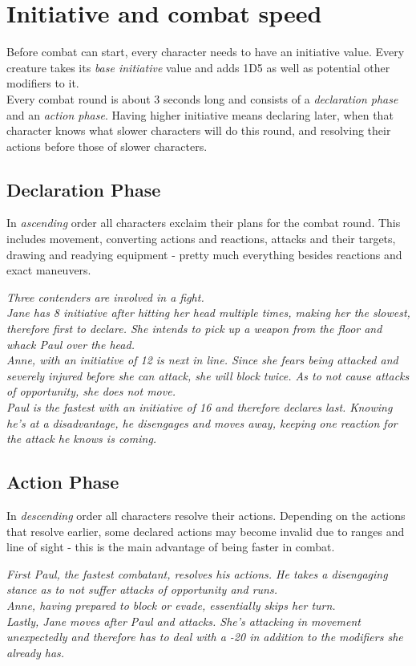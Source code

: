 \section{Initiative and combat speed}
Before combat can start, every character needs to have an initiative value. Every creature takes its \emph{base initiative} value and adds 1D5 as well as potential other modifiers to it.\\
Every combat round is about 3 seconds long and consists of a \textit{declaration phase} and an \textit{action phase}. Having higher initiative means declaring later, when that character knows what slower characters will do this round, and resolving their actions before those of slower characters.
\subsection{Declaration Phase}
In \emph{ascending} order all characters exclaim their plans for the combat round. This includes movement, converting actions and reactions, attacks and their targets, drawing and readying equipment - pretty much everything besides reactions and exact maneuvers.
\begin{exampleblock}
	\itshape
	Three contenders are involved in a fight.\\
	Jane has 8 initiative after hitting her head multiple times, making her the slowest, therefore first to declare. She intends to pick up a weapon from the floor and whack Paul over the head.\\
	Anne, with an initiative of 12 is next in line. Since she fears being attacked and severely injured before she can attack, she will block twice. As to not cause attacks of opportunity, she does not move.\\
	Paul is the fastest with an initiative of 16 and therefore declares last. Knowing he's at a disadvantage, he disengages and moves away, keeping one reaction for the attack he knows is coming.
\end{exampleblock}
\subsection{Action Phase}
In \emph{descending} order all characters resolve their actions. Depending on the actions that resolve earlier, some declared actions may become invalid due to ranges and line of sight - this is the main advantage of being faster in combat.
\begin{exampleblock}
	\itshape
	First Paul, the fastest combatant, resolves his actions. He takes a disengaging stance as to not suffer attacks of opportunity and runs.\\
	Anne, having prepared to block or evade, essentially skips her turn.\\
	Lastly, Jane moves after Paul and attacks. She's attacking in movement unexpectedly and therefore has to deal with a -20 in addition to the modifiers she already has.
\end{exampleblock}
